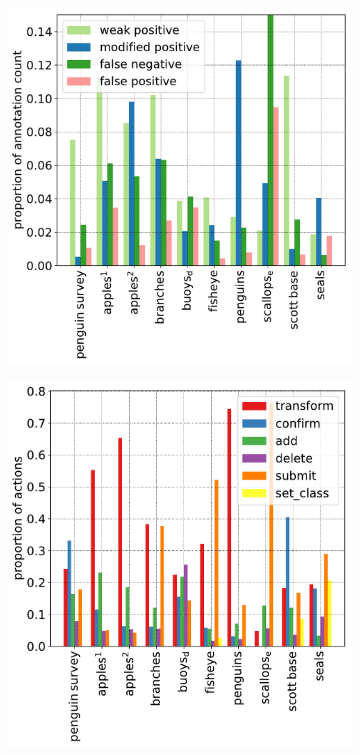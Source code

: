 \begin{figure}[ht!] 
\centering
\begin{subfigure}{0.48\linewidth}
\includegraphics[width=1.0\linewidth]{charts/summaries/correction_counts.pdf}
\caption{}
\label{fig:actions_dataset_a}
\end{subfigure}%
\begin{subfigure}{0.48\linewidth}
\includegraphics[width=1.0\linewidth]{charts/summaries/action_counts.pdf}
\caption{}
\label{fig:actions_dataset_b}
\end{subfigure}


\end{figure}
